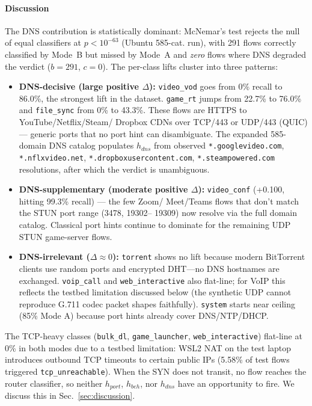 \documentclass[journal,onecolumn]{IEEEtran}
\begin{document}

\paragraph{Discussion}
The DNS contribution is statistically dominant: McNemar's test rejects
the null of equal classifiers at $p < 10^{-63}$ (Ubuntu 585-cat. run),
with 291 flows correctly classified by Mode~B but missed by Mode~A and
\emph{zero} flows where DNS degraded the verdict ($b=291$, $c=0$). The
per-class lifts cluster into three patterns:

\begin{itemize}
\item \textbf{DNS-decisive (large positive $\Delta$):} \texttt{video\_vod}
goes from 0\% recall to 86.0\%, the strongest lift in the dataset.
\texttt{game\_rt} jumps from 22.7\% to 76.0\% and \texttt{file\_sync}
from 0\% to 43.3\%. These flows are HTTPS to YouTube/Netflix/Steam/
Dropbox CDNs over TCP/443 or UDP/443 (QUIC) — generic ports that no
port hint can disambiguate. The expanded 585-domain DNS catalog
populates $h_{dns}$ from observed \texttt{*.googlevideo.com},
\texttt{*.nflxvideo.net}, \texttt{*.dropboxusercontent.com},
\texttt{*.steampowered.com} resolutions, after which the verdict is
unambiguous.

\item \textbf{DNS-supplementary (moderate positive $\Delta$):}
\texttt{video\_conf} (+0.100, hitting 99.3\% recall) — the few Zoom/
Meet/Teams flows that don't match the STUN port range (3478, 19302–
19309) now resolve via the full domain catalog. Classical port hints
continue to dominate for the remaining UDP STUN game-server flows.

\item \textbf{DNS-irrelevant ($\Delta \approx 0$):} \texttt{torrent}
shows no lift because modern BitTorrent clients use random ports and
encrypted DHT—no DNS hostnames are exchanged. \texttt{voip\_call} and
\texttt{web\_interactive} also flat-line; for VoIP this reflects the
testbed limitation discussed below (the synthetic UDP cannot reproduce
G.711 codec packet shapes faithfully). \texttt{system} starts near
ceiling (85\% Mode A) because port hints already cover DNS/NTP/DHCP.
\end{itemize}

The TCP-heavy classes (\texttt{bulk\_dl}, \texttt{game\_launcher},
\texttt{web\_interactive}) flat-line at 0\% in both modes due to a
testbed limitation: WSL2 NAT on the test laptop introduces outbound
TCP timeouts to certain public IPs (5.58\% of test flows triggered
\texttt{tcp\_unreachable}). When the SYN does not transit, no flow
reaches the router classifier, so neither $h_{port}$, $h_{beh}$, nor
$h_{dns}$ have an opportunity to fire. We discuss this in
Sec.~\ref{sec:discussion}.
\end{document}

